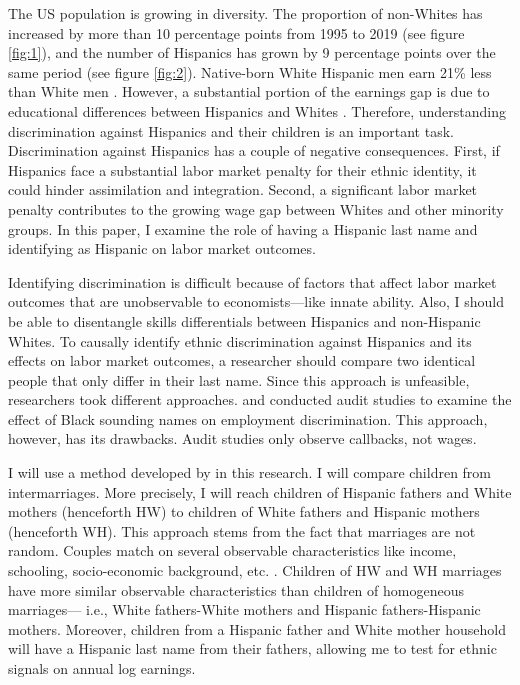 \documentclass{wptemp}
\begin{document}
The US population is growing in diversity. The proportion of non-Whites has increased by more than 10 percentage points from 1995 to 2019 (see figure \ref{fig:1}), and the number of Hispanics has grown by 9 percentage points over the same period (see figure \ref{fig:2}). Native-born White Hispanic men earn 21\% less than White men \citep{duncan2018identifying}. However, a substantial portion of the earnings gap is due to educational differences between Hispanics and Whites \citep{duncan2006hispanics, duncan2018socioeconomic}. Therefore, understanding discrimination against Hispanics and their children is an important task. Discrimination against Hispanics has a couple of negative consequences. First, if Hispanics face a substantial labor market penalty for their ethnic identity, it could hinder assimilation and integration. Second, a significant labor market penalty contributes to the growing wage gap between Whites and other minority groups. In this paper, I examine the role of having a Hispanic last name and identifying as Hispanic on labor market outcomes. 


Identifying discrimination is difficult because of factors that affect labor market outcomes that are unobservable to economists---like innate ability. Also, I should be able to disentangle skills differentials between Hispanics and non-Hispanic Whites. To causally identify ethnic discrimination against Hispanics and its effects on labor market outcomes, a researcher should compare two identical people that only differ in their last name. Since this approach is unfeasible, researchers took different approaches. \citet{bertrand2004emily} and \citet{fryer2004causes} conducted audit studies to examine the effect of Black sounding names on employment discrimination. This approach, however, has its drawbacks. Audit studies only observe callbacks, not wages. 

I will use a method developed by \citet{rubinstein2014pride} in this research. I will compare children from intermarriages. More precisely, I will reach children of Hispanic fathers and White mothers (henceforth HW) to children of White fathers and Hispanic mothers (henceforth  WH). This approach stems from the fact that marriages are not random. Couples match on several observable characteristics like income, schooling, socio-economic background, etc. \citep{averettBetterWorseRelationship2008, averettEconomicRealityBeauty1996, beckerTheoryMarriagePart1973, beckerTheoryMarriagePart1974, beckerTreatiseFamily1993, browningCollectiveUnitaryModels2006, chiapporiFatterAttractionAnthropometric2012}. Children of HW and WH marriages have more similar observable characteristics than children of homogeneous marriages--- i.e., White fathers-White mothers and Hispanic fathers-Hispanic mothers. Moreover, children from a Hispanic father and White mother household will have a Hispanic last name from their fathers, allowing me to test for ethnic signals on annual log earnings.
\end{document}
